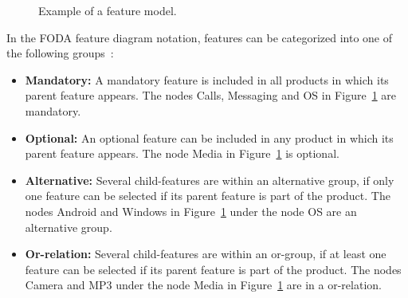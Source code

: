 \begin{figure}[hbt]
\centering
{}
\caption{Example of a feature model.}
\label{fig:exFM}
\end{figure}


In the FODA feature diagram notation, features can be categorized into one of the following groups~\cite{feature-ori-pl-engineering, automated-test-data-generation-feature-models, staged-configuration, feature-model-survey}:
\begin{itemize}
 \item \textbf{Mandatory:} A mandatory feature is included in all products in which its parent feature appears. The nodes \textsf{Calls}, \textsf{Messaging} and \textsf{OS} in Figure~\ref{fig:exFM} are mandatory.
 
 \item \textbf{Optional:} An optional feature can be included in any product in which its parent feature appears. The node \textsf{Media} in Figure~\ref{fig:exFM} is optional.
 
 \item \textbf{Alternative:} Several child-features are within an alternative group, if only one feature can be selected if its parent feature is part of the product. The nodes \textsf{Android} and \textsf{Windows} in Figure~\ref{fig:exFM} under the node \textsf{OS} are an alternative group.
 
 \item \textbf{Or-relation:} Several child-features are within an or-group, if at least one feature can be selected if its parent feature is part of the product. The nodes \textsf{Camera} and \textsf{MP3} under the node \textsf{Media} in Figure~\ref{fig:exFM} are in a or-relation.
\end{itemize}

